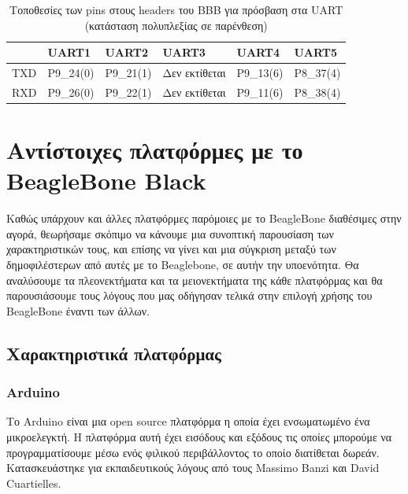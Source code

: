 \documentclass[12pt, a4paper, oneside]{report}
\begin{document}
\begin{table}
\centering
\caption[Τοποθεσίες στους headers για πρόσβαση στα UART]{Τοποθεσίες των pins στους headers του BBB για πρόσβαση στα UART (κατάσταση πολυπλεξίας σε παρένθεση)}\label{pinakas2}
\vspace*{1em}
\footnotesize
{\renewcommand{\arraystretch}{1.5}
\renewcommand{\tabcolsep}{0.2cm}
\begin{tabular}{|C{2cm} L{2cm} L{2cm} L{2.5cm} L{2cm} L{2cm}|}
\hline
 & \textbf{UART1} & \textbf{UART2} & \textbf{UART3} & \textbf{UART4} & \textbf{UART5}\\ \hline
TXD & P9\_24(0) & P9\_21(1) & Δεν εκτίθεται & P9\_13(6) & P8\_37(4)\\ \hline
RXD & P9\_26(0) & P9\_22(1) & Δεν εκτίθεται & P9\_11(6) & P8\_38(4)\\
\hline
\end{tabular}
}
\end{table}
\clearpage

\section{Αντίστοιχες πλατφόρμες με το BeagleBone Black}

Καθώς υπάρχουν και άλλες πλατφόρμες παρόμοιες με το BeagleBone διαθέσιμες στην αγορά, θεωρήσαμε σκόπιμο να κάνουμε μια συνοπτική παρουσίαση των χαρακτηριστικών τους, και επίσης να γίνει και μια σύγκριση μεταξύ των δημοφιλέστερων από αυτές με το Beaglebone, σε αυτήν την υποενότητα. Θα αναλύσουμε τα πλεονεκτήματα και τα μειονεκτήματα της κάθε πλατφόρμας και θα παρουσιάσουμε τους λόγους που μας οδήγησαν τελικά στην επιλογή χρήσης του BeagleBone έναντι των άλλων.

\subsection{Χαρακτηριστικά πλατφόρμας}

\subsubsection{Arduino}

Το Arduino είναι μια open source πλατφόρμα η οποία έχει ενσωματωμένο ένα μικροελεγκτή. Η πλατφόρμα αυτή έχει εισόδους και εξόδους τις οποίες μπορούμε να προγραμματίσουμε μέσω ενός φιλικού περιβάλλοντος το οποίο διατίθεται δωρεάν. Κατασκευάστηκε για εκπαιδευτικούς λόγους από τους Massimo Banzi και David Cuartielles.
\end{document}
